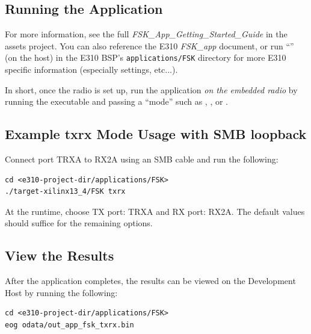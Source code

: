 \begin{flushleft}
\section{Running the Application}
For more information, see the full \textit{FSK\_App\_Getting\_Started\_Guide} in the assets project. You can also reference the E310 \textit{FSK\_app} document, or run ``'' (on the host) in the E310 BSP's \texttt{applications/FSK} directory for more E310 specific information (especially  settings, etc...).\\\medskip

In short, once the radio is set up, run the application \textit{on the embedded radio} by running the executable and passing a ``mode'' such as , ,  or .

\subsection{Example txrx Mode Usage with SMB loopback}
Connect port TRXA to RX2A using an SMB cable and run the following:\\
\begin{lstlisting}
cd <e310-project-dir/applications/FSK>
./target-xilinx13_4/FSK txrx
\end{lstlisting}
At the runtime, choose TX port: TRXA and RX port: RX2A. The default values should suffice for the remaining options.
\subsection{View the Results}
After the application completes, the results can be viewed on the Development Host by running the following:
\begin{lstlisting}
cd <e310-project-dir/applications/FSK>
eog odata/out_app_fsk_txrx.bin
\end{lstlisting}
\end{flushleft}
